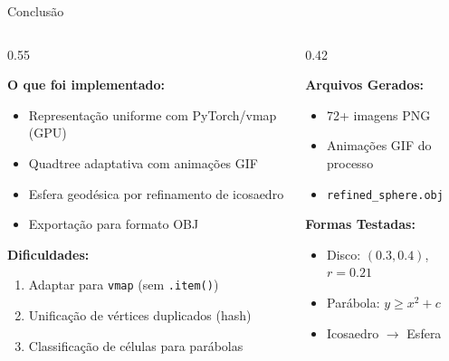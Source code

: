 \documentclass[aspectratio=169,11pt]{beamer}
\begin{document}
\begin{frame}{Conclusão}

\begin{columns}[T]
\begin{column}{0.55\textwidth}

\textbf{O que foi implementado:}
\begin{itemize}
    \item Representação uniforme com PyTorch/vmap (GPU)
    \item Quadtree adaptativa com animações GIF
    \item Esfera geodésica por refinamento de icosaedro
    \item Exportação para formato OBJ
\end{itemize}

\vspace{0.3cm}

\textbf{Dificuldades:}
\begin{enumerate}
    \item Adaptar para \texttt{vmap} (sem \texttt{.item()})
    \item Unificação de vértices duplicados (hash)
    \item Classificação de células para parábolas
\end{enumerate}

\end{column}

\begin{column}{0.42\textwidth}

\textbf{Arquivos Gerados:}
\begin{itemize}
    \item 72+ imagens PNG
    \item Animações GIF do processo
    \item \texttt{refined\_sphere.obj}
\end{itemize}

\vspace{0.3cm}

\textbf{Formas Testadas:}
\begin{itemize}
    \item Disco: $(0.3, 0.4)$, $r=0.21$
    \item Parábola: $y \geq x^2 + c$
    \item Icosaedro $\to$ Esfera
\end{itemize}

\end{column}
\end{columns}

\end{frame}
\end{document}
